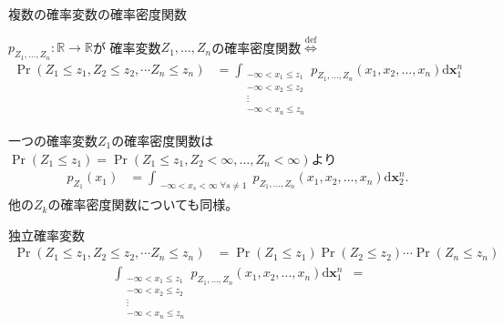 \documentclass[lualatex,handout]{beamer}
\newcommand{\mycolor}[2]{%
  \begingroup
  \colorlet{currentcolor}{.}%
  \color{#1}#2%
  \color{currentcolor}%
  \endgroup
}
\newcommand{\emm}[1]{\mycolor{red}{#1}}
\theoremstyle{definition}
\begin{document}
\begin{frame}{複数の確率変数の確率密度関数}
\small
\begin{definition}
$p_{Z_1,\dotsc,Z_n}\colon \mathbb{R}\to\mathbb{R}$が
確率変数$Z_1,\dotsc,Z_n$の確率密度関数$\stackrel{\mathrm{def}}{\iff}$
\begin{align*}
\Pr(Z_1\le z_1, Z_2\le z_2,\dotsm Z_n\le z_n)&=
\int_{\substack{-\infty< x_1 \le z_1\\ -\infty< x_2\le z_2\\\vdots\\-\infty<x_n\le z_n}} p_{Z_1,\dotsc,Z_n}(x_1,x_2,\dotsc,x_n)\mathrm{d}{\symbf{x}_1^n}
\end{align*}
\end{definition}
一つの確率変数$Z_1$の確率密度関数は$\Pr(Z_1\le z_1) = \Pr(Z_1\le z_1, Z_2 <\infty,\dotsc, Z_n<\infty)$より
\begin{align*}
p_{Z_1}(x_1)&=
\int_{\substack{-\infty< x_s <\infty \;\forall s\ne 1}} p_{Z_1,\dotsc,Z_n}(x_1,x_2,\dotsc,x_n)\mathrm{d}{\symbf{x}_2^n}.
\end{align*}
他の$Z_k$の確率密度関数についても同様。
\end{frame}

\begin{frame}{独立確率変数}
\begin{align*}
\Pr(Z_1\le z_1, Z_2\le z_2,\dotsm Z_n\le z_n)&=
\Pr(Z_1\le z_1)\Pr(Z_2\le z_2)\dotsm \Pr(Z_n\le z_n)
\end{align*}
\begin{align*}
\int_{\substack{-\infty< x_1 \le z_1\\ -\infty< x_2\le z_2\\\vdots\\-\infty<x_n\le z_n}} p_{Z_1,\dotsc,Z_n}(x_1,x_2,\dotsc,x_n)\mathrm{d}{\symbf{x}_1^n}
&=
\end{align*}
\end{frame}
\end{document}
